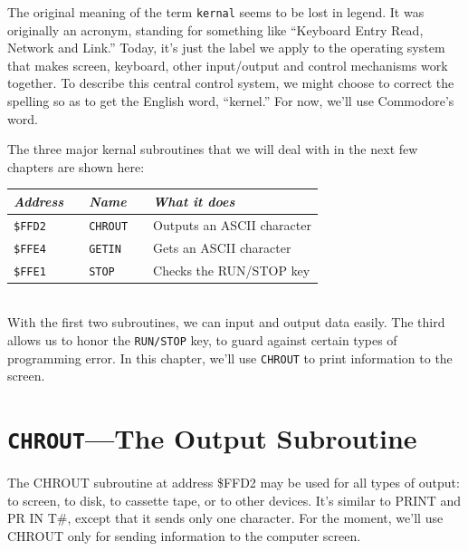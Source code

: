 \documentclass[11pt,a4paper,titlepage]{memoir}
\begin{document}
The original meaning of the term \texttt{kernal} seems to be lost in legend. It was
originally an acronym, standing for something like ``Keyboard Entry Read,
Network and Link.'' Today, it's just the label we apply to the operating
system that makes screen, keyboard, other input/output and control mechanisms work together. To describe this central control system, we might
choose to correct the spelling so as to get the English word, ``kernel.'' For
now, we'll use Commodore's word.

The three major kernal subroutines that we will deal with in the next few
chapters are shown here:\\

\begin{tabular}{lllll}
	\emph{Address} &  & \emph{Name} &  & \emph{What it does} \\
	\hline
	\texttt{\$FFD2} &  & \texttt{CHROUT} &  & Outputs an ASCII character \\
	\texttt{\$FFE4} &  & \texttt{GETIN} &  & Gets an ASCII character \\
	\texttt{\$FFE1} &  & \texttt{STOP} &  & Checks the RUN/STOP key \\
\end{tabular}\\

With the first two subroutines, we can input and output data easily. The
third allows us to honor the \texttt{RUN/STOP} key, to guard against certain types
of programming error. In this chapter, we'll use \texttt{CHROUT} to print information to the screen.

\section{\texttt{CHROUT}—The Output Subroutine}
The CHROUT subroutine at address \$FFD2 may be used for all types
of output: to screen, to disk, to cassette tape, or to other devices. It's
similar to PRINT and PR IN T\#, except that it sends only one character.
For the moment, we'll use CHROUT only for sending information to the
computer screen.\\\\
\end{document}
